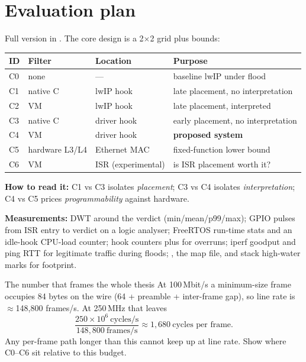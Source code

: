 \documentclass[10pt,a4paper]{article}
\begin{document}
\section{Evaluation plan}
Full version in . The core design is a 2$\times$2 grid plus bounds:

\begin{tabularx}{\textwidth}{@{}P{0.8cm}P{2.6cm}P{4.4cm}L@{}}
\toprule
\textbf{ID} & \textbf{Filter} & \textbf{Location} & \textbf{Purpose} \\
\midrule
C0 & none & --- & baseline lwIP under flood \\
C1 & native C & lwIP  hook & late placement, no interpretation \\
C2 & VM & lwIP  hook & late placement, interpreted \\
C3 & native C & driver hook & early placement, no interpretation \\
C4 & VM & driver hook & \textbf{proposed system} \\
C5 & hardware L3/L4 & Ethernet MAC & fixed-function lower bound \\
C6 & VM & ISR (experimental) & is ISR placement worth it? \\
\bottomrule
\end{tabularx}

\textbf{How to read it:} C1 vs C3 isolates \emph{placement}; C3 vs C4 isolates \emph{interpretation}; C4 vs C5 prices \emph{programmability} against hardware.

\textbf{Measurements:} DWT  around the verdict (min/mean/p99/max); GPIO pulses from ISR entry to verdict on a logic analyser; FreeRTOS run-time stats and an idle-hook CPU-load counter; hook counters plus  for overruns; iperf goodput and ping RTT for legitimate traffic during floods; , the map file,  and stack high-water marks for footprint.

\begin{keybox}{The number that frames the whole thesis}
At 100\,Mbit/s a minimum-size frame occupies 84 bytes on the wire (64 + preamble + inter-frame gap), so line rate is $\approx$148{,}800 frames/s. At 250\,MHz that leaves
\[
  \frac{250\times10^{6}\ \text{cycles/s}}{148{,}800\ \text{frames/s}} \approx 1{,}680\ \text{cycles per frame}.
\]
Any per-frame path longer than this cannot keep up at line rate. Show where C0--C6 sit relative to this budget.
\end{keybox}
\end{document}
